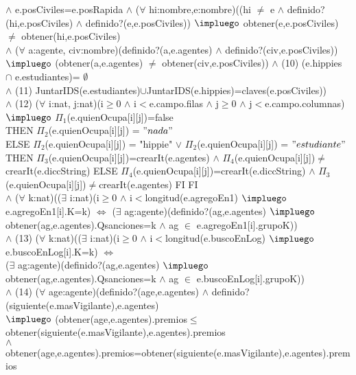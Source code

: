 { $\wedge$ e.posCiviles=e.posRapida $\wedge$ ($\forall$ hi:nombre,e:nombre)((hi $\neq$ e $\wedge$ definido?(hi,e.posCiviles) $\wedge$ definido?(e,e.posCiviles)) $\impluego$ obtener(e,e.posCiviles) $\neq$ obtener(hi,e.posCiviles) \\\hspace*{3em}$\wedge$ ($\forall$ a:agente, civ:nombre)(definido?(a,e.agentes) $\wedge$ definido?(civ,e.posCiviles)) \\\hspace*{3em} $\impluego$ (obtener(a,e.agentes) $\neq$ obtener(civ,e.posCiviles)) $\wedge$ (10) (e.hippies $\cap$ e.estudiantes)= $\emptyset$ \\\hspace*{3em} $\wedge$ (11) JuntarIDS(e.estudiantes)$\cup$JuntarIDS(e.hippies)=claves(e.posCiviles)) \\\hspace*{3em} $\wedge$ (12) ($\forall$ i:nat, j:nat)(i$\geq$0 $\wedge$ i$<$e.campo.filas $\wedge$ j$\geq$0 $\wedge$ j$<$e.campo.columnas) $\impluego$ \IF $\Pi_{1}$(e.quienOcupa[i][j])=false \\\hspace*{3em} THEN $\Pi_{2}$(e.quienOcupa[i][j]) = $"nada"$ \\\hspace*{3em} ELSE \IF $\Pi_{2}$(e.quienOcupa[i][j]) = "hippie" $\vee$ $\Pi_{2}$(e.quienOcupa[i][j]) = $"estudiante"$ THEN $\Pi_{3}$(e.quienOcupa[i][j])=crearIt(e.agentes) $\wedge$ $\Pi_{4}$(e.quienOcupa[i][j])$\neq$ crearIt(e.diccString) ELSE   $\Pi_{4}$(e.quienOcupa[i][j])=crearIt(e.diccString) $\wedge$ $\Pi_{3}$(e.quienOcupa[i][j])$\neq$crearIt(e.agentes) FI FI \\\hspace*{3em} $\wedge$ ($\forall$ k:nat)(($\exists$ i:nat)(i$\geq$0 $\wedge$ i$<$longitud(e.agregoEn1) $\impluego$ e.agregoEn1[i].K=k) $\Longleftrightarrow$ ($\exists$ ag:agente)(definido?(ag,e.agentes) $\impluego$ obtener(ag,e.agentes).Qsanciones=k $\wedge$ ag $\in$ e.agregoEn1[i].grupoK)) \\\hspace*{3em} $\wedge$ (13) ($\forall$ k:nat)(($\exists$ i:nat)(i$\geq$0 $\wedge$ i$<$longitud(e.buscoEnLog) $\impluego$ e.buscoEnLog[i].K=k) $\Longleftrightarrow$ \\\hspace*{3em} ($\exists$ ag:agente)(definido?(ag,e.agentes) $\impluego$ obtener(ag,e.agentes).Qsanciones=k $\wedge$ ag $\in$ e.buscoEnLog[i].grupoK)) \\\hspace*{3em} $\wedge$ (14) ($\forall$ age:agente)(definido?(age,e.agentes) $\wedge$ definido?(siguiente(e.masVigilante),e.agentes) \\\hspace*{3em} $\impluego$ (obtener(age,e.agentes).premios$\leq$ obtener(siguiente(e.masVigilante),e.agentes).premios \\\hspace*{3em} $\wedge$ obtener(age,e.agentes).premios=obtener(siguiente(e.masVigilante),e.agentes).premios \\\hspace*{3em} }
